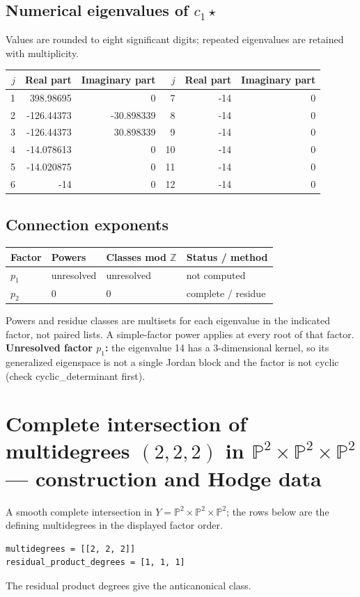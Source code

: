 \documentclass[10pt,a4paper]{article}
\begin{document}
\subsection*{Numerical eigenvalues of $c_1\star$}
Values are rounded to eight significant digits; repeated eigenvalues are retained with multiplicity.
\begin{center}\small\begin{tabular}{rrr@{\qquad}rrr}\toprule $j$ & Real part & Imaginary part & $j$ & Real part & Imaginary part\\\midrule
1 & 398.98695 & 0 & 7 & -14 & 0\\
2 & -126.44373 & -30.898339 & 8 & -14 & 0\\
3 & -126.44373 & 30.898339 & 9 & -14 & 0\\
4 & -14.078613 & 0 & 10 & -14 & 0\\
5 & -14.020875 & 0 & 11 & -14 & 0\\
6 & -14 & 0 & 12 & -14 & 0\\
\bottomrule\end{tabular}\end{center}
\subsection*{Connection exponents}
\begin{center}\begin{tabular}{llll}\toprule Factor & Powers & Classes mod $\mathbb Z$ & Status / method\\\midrule
$p_{1}$ & unresolved & unresolved & not computed\\
$p_{2}$ & $0$ & $0$ & complete / residue\\
\bottomrule\end{tabular}\end{center}
Powers and residue classes are multisets for each eigenvalue in the indicated factor, not paired lists. A simple-factor power applies at every root of that factor.
\textbf{Unresolved factor $p_{1}$:} the eigenvalue 14 has a 3-dimensional kernel, so its generalized eigenspace is not a single Jordan block and the factor is not cyclic (check cyclic\_determinant first).
\clearpage\section*{Complete intersection of multidegrees $(2,2,2)$ in $\mathbb P^{2}\times \mathbb P^{2}\times \mathbb P^{2}$ --- construction and Hodge data}\label{entry:PROD5-C01}
A smooth complete intersection in $Y=\mathbb P^{2}\times\mathbb P^{2}\times\mathbb P^{2}$; the rows below are the defining multidegrees in the displayed factor order.
\begin{lstlisting}
multidegrees = [[2, 2, 2]]
residual_product_degrees = [1, 1, 1]
\end{lstlisting}
The residual product degrees give the anticanonical class.
\end{document}

